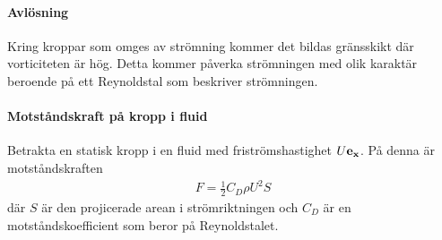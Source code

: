 \paragraph{Avlösning}
Kring kroppar som omges av strömning kommer det bildas gränsskikt där vorticiteten är hög. Detta kommer påverka strömningen med olik karaktär beroende på ett Reynoldstal som beskriver strömningen.

\paragraph{Motståndskraft på kropp i fluid}
Betrakta en statisk kropp i en fluid med friströmshastighet $U\vb{e}_{\vb{x}}$. På denna är motståndskraften
\begin{align*}
	F = \frac{1}{2}C_{D}\rho U^{2}S
\end{align*}
där $S$ är den projicerade arean i strömriktningen och $C_{D}$ är en motståndskoefficient som beror på Reynoldstalet.